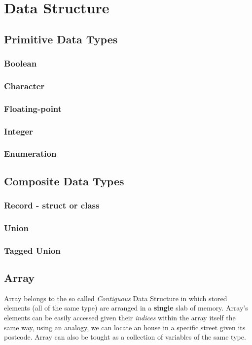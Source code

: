 
\part{Data Structure}

\chapter{Primitive Data Types}

\section{Boolean}
\iffalse
https://oopscenities.net/2011/09/28/c-primitive-types/
https://en.wikipedia.org/wiki/Primitive_data_type
http://rypress.com/tutorials/objective-c/data-types/primitives
https://en.wikipedia.org/wiki/C_data_types
\fi
\section{Character}

\section{Floating-point}

\section{Integer}

\section{Enumeration}


\chapter{Composite Data Types}
\section{Record - struct or class}
\section{Union}
\section{Tagged Union}


\chapter{Array}
Array belongs to the so called \textit{Contiguous} Data Structure in which stored elements (all of the same type) are arranged in a \textbf{single} slab of memory. Array's elements can be easily  accessed given their \textit{indices} within the array itself the same way, using an analogy, we can locate an house in a specific street given its postcode. Array can also be tought as a collection of variables of the same type.

